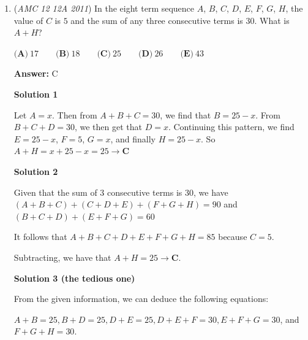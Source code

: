 \begin{enumerate}
\textbf{Solution 3 (essentially Solutions 1 and 2 but cleaned with variables)}

We let $s$ be the number of students that bought pencils at the bookstore, $c$ be the cost of each pencil in cents, and $n$ the number of pencils each student bought. Thus, we are looking for $c.$ Since a majority of the students in the class bought pencils at the bookstore, $s>\dfrac{30}2=15.$ (s>15) We also know that $n>1$ and $c>n>1.$ Finally, $s\cdot c\cdot n=1771.$ We can factor $1771$ as $7\cdot11\cdot23.$ Since $n>15$ and $c>n>1,$ none of them can be $1,$ and therefore $c,n,$ and $s$ are $7,11,$ and $23$ in some order. We know that $n>15,$ so $n$ must be $23.$ $c>n,$ so $c=11$ and $n=7.$ Thus, $c=\boxed{\text{(B)}~11}$ cents.~Technodoggo

 


 


	\item (\textit{AMC 12 12A 2011}) In the eight term sequence $A$, $B$, $C$, $D$, $E$, $F$, $G$, $H$, the value of $C$ is $5$ and the sum of any three consecutive terms is $30$. What is $A+H$?


 $\textbf{(A)}\ 17 \qquad \textbf{(B)}\ 18 \qquad \textbf{(C)}\ 25 \qquad \textbf{(D)}\ 26 \qquad \textbf{(E)}\ 43$

 \textbf{Answer: }C



\textbf{Solution 1}

Let $A=x$. Then from $A+B+C=30$, we find that $B=25-x$. From $B+C+D=30$, we then get that $D=x$. Continuing this pattern, we find $E=25-x$, $F=5$, $G=x$, and finally $H=25-x$. So $A+H=x+25-x=25 \rightarrow \boxed{\textbf{C}}$




\textbf{Solution 2}

Given that the sum of 3 consecutive terms is 30, we have$(A+B+C)+(C+D+E)+(F+G+H)=90$ and $(B+C+D)+(E+F+G)=60$

 It follows that $A+B+C+D+E+F+G+H=85$ because $C=5$.

 Subtracting, we have that $A+H=25\rightarrow \boxed{\textbf{C}}$.

 


 



\textbf{Solution 3 (the tedious one)}

From the given information, we can deduce the following equations:

 $A+B=25, B+D=25, D+E=25, D+E+F=30, E+F+G =30$, and $F+G+H=30$.


\end{enumerate}
